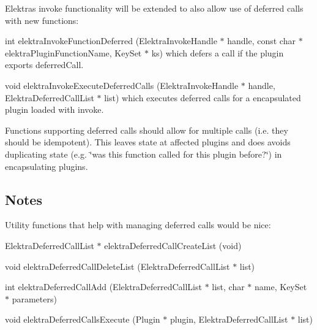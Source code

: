 \begin{DoxyItemize}
\item Elektra\textquotesingle{}s invoke functionality will be extended to also allow use of deferred calls with new functions\+:
\item {\ttfamily int elektra\+Invoke\+Function\+Deferred (Elektra\+Invoke\+Handle $\ast$ handle, const char $\ast$ elektra\+Plugin\+Function\+Name, Key\+Set $\ast$ ks)} which defers a call if the plugin exports {\ttfamily deferred\+Call}.
\item {\ttfamily void elektra\+Invoke\+Execute\+Deferred\+Calls (Elektra\+Invoke\+Handle $\ast$ handle, Elektra\+Deferred\+Call\+List $\ast$ list)} which executes deferred calls for a encapsulated plugin loaded with invoke.
\item Functions supporting deferred calls should allow for multiple calls (i.\+e. they should be idempotent). This leaves state at affected plugins and does avoids duplicating state (e.\+g. \char`\"{}was this function called for this plugin before?\char`\"{}) in encapsulating plugins.
\end{DoxyItemize}

\subsection*{Notes}

Utility functions that help with managing deferred calls would be nice\+:


\begin{DoxyItemize}
\item {\ttfamily Elektra\+Deferred\+Call\+List $\ast$ elektra\+Deferred\+Call\+Create\+List (void)}
\item {\ttfamily void elektra\+Deferred\+Call\+Delete\+List (Elektra\+Deferred\+Call\+List $\ast$ list)}
\item {\ttfamily int elektra\+Deferred\+Call\+Add (Elektra\+Deferred\+Call\+List $\ast$ list, char $\ast$ name, Key\+Set $\ast$ parameters)}
\item {\ttfamily void elektra\+Deferred\+Calls\+Execute (Plugin $\ast$ plugin, Elektra\+Deferred\+Call\+List $\ast$ list)} 
\end{DoxyItemize}